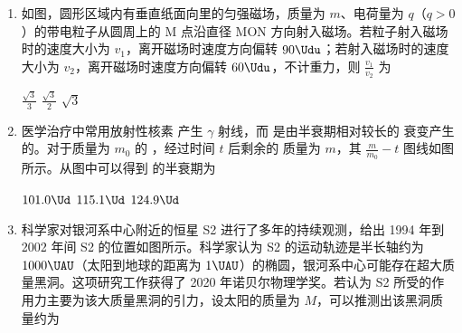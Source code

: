 \documentclass[\gkver]{gaokaozhenti}
\begin{document}
\begin{enumerate}
{	故选 A。
}

\item
如图，圆形区域内有垂直纸面向里的匀强磁场，质量为 $m$、电荷量为 $q$（$q>0$）的带电粒子从圆周上的 M 点沿直径 MON 方向射入磁场。若粒子射入磁场时的速度大小为 $v_{1}$，离开磁场时速度方向偏转 $90\Udu$；若射入磁场时的速度大小为 $v_{2}$，离开磁场时速度方向偏转 $60\Udu$，不计重力，则 $\frac{v_{1}}{v_{2}}$ 为 


{$\frac{\sqrt{3}}{3}$}
{$\frac{\sqrt{3}}{2}$}
{$\sqrt{3}$}


\item
医学治疗中常用放射性核素  产生 $\gamma$ 射线，而  是由半衰期相对较长的  衰变产生的。对于质量为 $m_{0}$ 的 ，经过时间 $t$ 后剩余的  质量为 $m$，其 $\frac{m}{m_{0}}-t$ 图线如图所示。从图中可以得到  的半衰期为 


\fourchoices[answer=C]
{$67.3\Ud$}
{$101.0\Ud$}
{$115.1\Ud$}
{$124.9\Ud$}


\item
科学家对银河系中心附近的恒星 S2 进行了多年的持续观测，给出 1994 年到 2002 年间 S2 的位置如图所示。科学家认为 S2 的运动轨迹是半长轴约为 $1000 \UAU$（太阳到地球的距离为 $1 \UAU$）的椭圆，银河系中心可能存在超大质量黑洞。这项研究工作获得了 2020 年诺贝尔物理学奖。若认为 S2 所受的作用力主要为该大质量黑洞的引力，设太阳的质量为 $M$，可以推测出该黑洞质量约为 


\end{enumerate}
\end{document}
